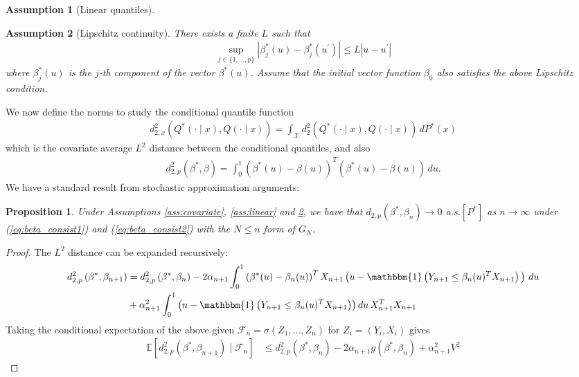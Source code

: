 \documentclass[11pt,a4paper]{article}
\newtheorem{prop}{Proposition}
\newtheorem{as}{Assumption}
\newcommand{\E}{\mathbb{E}}
\begin{document}
\begin{appendices}
\begin{as}[Linear quantiles]
\end{as}
\begin{as}[Lipschitz continuity]\label{ass:reg_lipschitz}
There exists a finite $L$ such that
\begin{align*}
    \sup_{j \in \{1,\ldots,p\}} |\beta^*_j(u) - \beta^*_{j}(u^{\prime})| \leq L|u - u^{\prime}|
\end{align*}
where $\beta^*_j(u)$ is the $j$-th component of the vector $\beta^*(u)$. Assume that the initial vector function $\beta_0$ also satisfies the above Lipschitz condition.
\end{as}
 We now define the norms to study the conditional quantile function
\begin{align*}
    {d}^2_{2,x}(Q^*(\cdot \mid x),Q(\cdot \mid x)) = \int_{\mathcal{X}} d^2_2(Q^*(\cdot \mid x),Q(\cdot \mid x))\, dP^*(x)
\end{align*}
which is the covariate average $L^2$ distance between the conditional quantiles, and also
\begin{align*}
    {d}^{2}_{2,p}(\beta^*,\beta) = \int_0^1 \left(\beta^*(u) - \beta(u)\right)^T\left(\beta^*(u) - \beta(u)\right)\, du.
\end{align*}
We have a standard result from stochastic approximation arguments:
\begin{prop}
         Under {Assumptions \ref{ass:covariate}}, {\ref{ass:linear}} and {\ref{ass:reg_lipschitz}}, we have that
             ${d}_{2,p}(\beta^*,\beta_n) \to 0$ a.s.$[P^*]$
          as $n \to \infty$ under (\ref{eq:beta_consist1}) and (\ref{eq:beta_consist2}) with the $N\leq n$ form of $G_{N}$.
\end{prop}
\begin{proof}
The $L^2$ distance can be expanded recursively:
\begin{align*}
    d^2_{2,p}\left(\beta^*, \beta_{n+1}\right) &= d^2_{2,p}\left(\beta^*, \beta_{n}\right) - 2 \alpha_{n+1} \int_0^1  \left(\beta^*(u) - \beta_n(u)\right)^T X_{n+1}\left(u - \mathbbm{1}\left(Y_{n+1} \leq \beta_n(u)^T X_{n+1}\right)\,\right) \, du\\
    &+\alpha_{n+1}^2 \int_0^1 \left(u - \mathbbm{1}\left(Y_{n+1} \leq \beta_n(u)^T X_{n+1}\right)\right)  du \, X_{n+1}^T X_{n+1} \
\end{align*}
Taking the conditional expectation of the above given $\mathcal{F}_n = \sigma(Z_{1},\ldots,Z_n)$ for $Z_i = (Y_i,X_i)$ gives
\begin{align*}
  \E\left[d^2_{2,p}\left(\beta^*, \beta_{n+1}\right) \mid \mathcal{F}_n \right]  &\leq d^2_{2,p}\left(\beta^*, \beta_{n}\right) -  2 \alpha_{n+1}  g(\beta^*,\beta_n)+ \alpha_{n+1}^2 V^2

\end{align*}
\end{proof}
\end{appendices}
\end{document}
